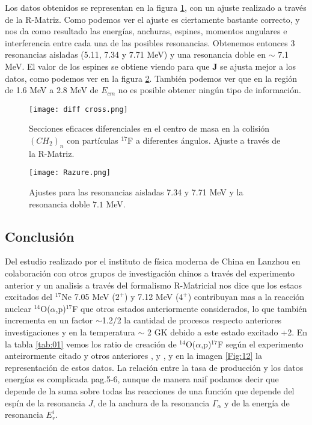 \documentclass[fleqn,11pt]{SelfArx} %
\newcommand{\Jn}{\mathbf{J}}
\begin{document}
Los datos obtenidos se representan en la figura \ref{Fig:10}, con un ajuste realizado a través de la R-Matriz. Como podemos ver el ajuste es ciertamente bastante correcto, y nos da como resultado las energías, anchuras, espines, momentos angulares e interferencia entre cada una de las posibles resonancias. Obtenemos entonces 3 resonancias aisladas (5.11, 7.34 y 7.71 MeV) y una resonancia doble en $\sim$ 7.1 MeV. El valor de los espines se obtiene viendo para que $\Jn$ se ajusta mejor a los datos, como podemos ver en la figura \ref{Fig:11}. También podemos ver que en la región de 1.6 MeV a 2.8 MeV de $E_{cm}$ no es posible obtener ningún tipo de información.

\begin{figure}[h!] \centering
	\texttt{[image: diff cross.png]}
	\caption{Secciones eficaces diferenciales en el centro de masa en la colisión $(CH_2)_n$ con partículas $^{17}$F a diferentes ángulos. Ajuste a través de la R-Matriz.}
	\label{Fig:10}
\end{figure}
\begin{figure}[h!] \centering
\texttt{[image: Razure.png]}
\caption{Ajustes para las resonancias aisladas 7.34 y 7.71 MeV y la resonancia doble $7.1$ MeV.}
\label{Fig:11}
\end{figure}


\subsection{Conclusión}

Del estudio realizado por el instituto de física moderna de China en Lanzhou \cite{Astrophysics} en colaboración con otros grupos de investigación chinos a través del experimento anterior y un analisis a través del formalismo R-Matricial nos dice que los estaos excitados del $^{17}$Ne 7.05 MeV ($2^+$)  y 7.12 MeV ($4^+$) contribuyan mas a la reacción nuclear $^{14}$O($\alpha$,p)$^{17}$F que otros estados anteriormente considerados, lo que también incrementa en un factor $\sim$1.2/2 la cantidad de procesos respecto anteriores investigaciones \cite{Astrophysics1} y \cite{Astrophysics2} en la temperatura $\sim$ 2 GK debido a este estado excitado +2. En la tabla \ref{tab:01} vemos los ratio de creación de $^{14}$O($\alpha$,p)$^{17}$F según el experimento anteirormente citado \cite{Astrophysics} y otros anteriores \cite{Astrophysics1},\cite{Astrophysics2} y \cite{Astrophysics3}, y en la imagen \ref{Fig:12} la representación de estos datos. La relación entre la tasa de producción y los datos energías es complicada \cite{Astrophysics} pag.5-6, aunque de manera naif podamos decir que depende de la suma sobre todas las reacciones de una función que depende del espín de la resonancia $J$, de la anchura de la resonancia $\Gamma_\alpha$ y de la energía de resonancia $E_{r}^i$.
\end{document}
